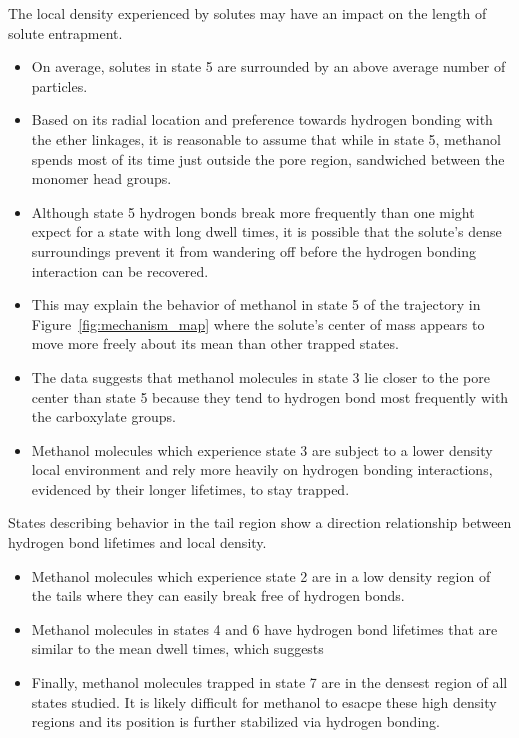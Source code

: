 \documentclass{article}
\begin{document}
  The local density experienced by solutes may have an impact on the length of solute 
  entrapment.
  \begin{itemize}
    \item On average, solutes in state 5 are surrounded by an above average number of
    particles. 
    \item Based on its radial location and preference towards hydrogen bonding
    with the ether linkages, it is reasonable to assume that while in state 5, methanol
    spends most of its time just outside the pore region, sandwiched between the 
    monomer head groups. 
    \item Although state 5 hydrogen bonds break more frequently than one might expect for 
    a state with long dwell times, it is possible that the solute's dense surroundings
    prevent it from wandering off before the hydrogen bonding interaction can be
    recovered.
    \item This may explain the behavior of methanol in state 5 of the trajectory in
    Figure~\ref{fig:mechanism_map} where the solute's center of mass appears to move
    more freely about its mean than other trapped states.
    \item The data suggests that methanol molecules in state 3 lie closer to the pore
    center than state 5 because they tend to hydrogen bond most frequently with 
    the carboxylate groups.
    \item Methanol molecules which experience state 3 are subject to a lower density 
    local environment and rely more heavily on hydrogen bonding interactions, 
    evidenced by their longer lifetimes, to stay trapped.
  \end{itemize}
  
  States describing behavior in the tail region show a direction relationship between 
  hydrogen bond lifetimes and local density.
  \begin{itemize}
    \item Methanol molecules which experience state 2 are in a low density region of the
    tails where they can easily break free of hydrogen bonds.
    \item Methanol molecules in states 4 and 6 have hydrogen bond lifetimes that are similar
    to the mean dwell times, which suggests
    \item Finally, methanol molecules trapped in state 7 are in the densest region of all
    states studied. It is likely difficult for methanol to esacpe these high density regions
    and its position is further stabilized via hydrogen bonding.
  \end{itemize}
  
\end{document}
